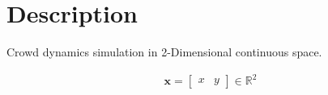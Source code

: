 \section{Description}
Crowd dynamics simulation in 2-Dimensional continuous space.

\begin{align}
\mathbf{x} = \begin{bmatrix} x & y \end{bmatrix} \in \mathbb{R}^{2}
\end{align}
